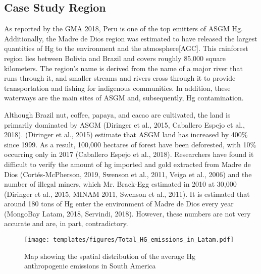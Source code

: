 \subsection{Case Study Region}
\begin{flushleft}
As reported by the GMA 2018, Peru is one of the top emitters of ASGM Hg. Additionally, the Madre de Dios region was estimated to have released the largest quantities of Hg to the environment and the atmosphere[AGC]. This rainforest region lies between Bolivia and Brazil and covers roughly 85,000 square kilometers. The region's name is derived from the name of a major river that runs through it, and smaller streams and rivers cross through it to provide transportation and fishing for indigenous communities. In addition, these waterways are the main sites of ASGM and, subsequently, Hg contamination. 
\end{flushleft}

\begin{flushleft}
Although Brazil nut, coffee, papaya, and cacao are cultivated, the land is primarily dominated by ASGM (Diringer et al., 2015, Caballero Espejo et al., 2018). (Diringer et al., 2015) estimate that ASGM land has increased by 400\% since 1999. As a result, 100,000 hectares of forest have been deforested, with 10\% occurring only in 2017 (Caballero Espejo et al., 2018). Researchers have found it difficult to verify the amount of hg imported and gold extracted from Madre de Dios (Cortés-McPherson, 2019, Swenson et al., 2011, Veiga et al., 2006) and the number of illegal miners, which Mr. Brack-Egg estimated in 2010 at 30,000 (Diringer et al., 2015, MINAM 2011, Swenson et al., 2011). It is estimated that around 180 tons of Hg enter the environment of Madre de Dios every year (MongoBay Latam, 2018, Servindi, 2018). However, these numbers are not very accurate and are, in part, contradictory. 
\end{flushleft}
\begin{figure}[H]
  \texttt{[image: templates/figures/Total\_HG\_emissions\_in\_Latam.pdf]}
  \centering
  \caption{Map showing the spatial distribution of the average Hg anthropogenic emissions in South America}
  \label{fig:Latam_Hg_em}
\end{figure}
\FloatBarrier

